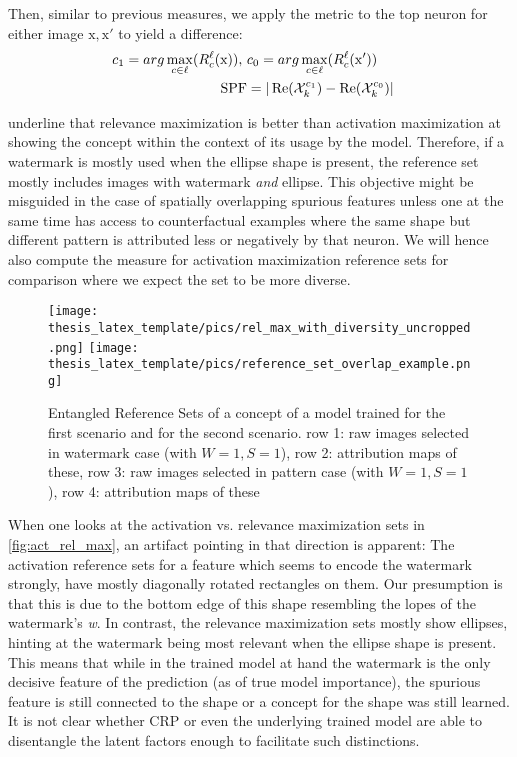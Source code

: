 Then, similar to previous measures, we apply the metric to the top neuron for either image $\mathrm{x, x'}$ to yield a difference:
\begin{align}\displaystyle
c_1 = arg\max_{c \in \ell} (R_c^{\ell}(\mathrm{x}) ), \ &  c_0 = arg\max_{c \in \ell} (R_c^{\ell}(\mathrm{x'})) &  \notag\\
\operatorname*{SPF} &= |\operatorname*{Re}(\mathcal{X}_k^{c_1}) - \operatorname*{Re}(\mathcal{X}_k^{c_0})| &
\end{align}

\citet{Achtibat2022} underline that relevance maximization is better than activation maximization at showing the concept within the context of its usage by the model. Therefore, if a watermark is mostly used when the ellipse shape is present, the reference set mostly includes images with watermark \textit{and} ellipse. This objective might be misguided in the case of spatially overlapping spurious features unless one at the same time has access to counterfactual examples where the same shape but different pattern is attributed less or negatively by that neuron. We will hence also compute the measure for activation maximization reference sets for comparison where we expect the set to be more diverse. 

\begin{figure}[t!]
    \centering
    \texttt{[image: thesis\_latex\_template/pics/rel\_max\_with\_diversity\_uncropped.png]}
    \texttt{[image: thesis\_latex\_template/pics/reference\_set\_overlap\_example.png]}
    \caption[Entangled Reference Sets]{Entangled Reference Sets of a concept of a model trained for the first scenario and for the second scenario.
    row 1: raw images selected in watermark case (with $W=1, S=1$), row 2: attribution maps of these, 
    row 3: raw images selected in pattern case (with $W=1, S=1$), row 4: attribution maps of these}
    \label{fig:entangled_ref_set}
\end{figure}

When one looks at the activation vs. relevance maximization sets in \cref{fig:act_rel_max}, an artifact pointing in that direction is apparent: 
The activation reference sets for a feature which seems to encode the watermark strongly, have mostly diagonally rotated rectangles on them. Our presumption is that this is due to the bottom edge of this shape resembling the lopes of the watermark's \textit{w}. 
In contrast, the relevance maximization sets mostly show ellipses, hinting at the watermark being most relevant when the ellipse shape is present. 
This means that while in the trained model at hand the watermark is the only decisive feature of the prediction (as of true model importance), the spurious feature is still connected to the shape or a concept for the shape was still learned. 
It is not clear whether CRP or even the underlying trained model are able to disentangle the latent factors enough to facilitate such distinctions.

